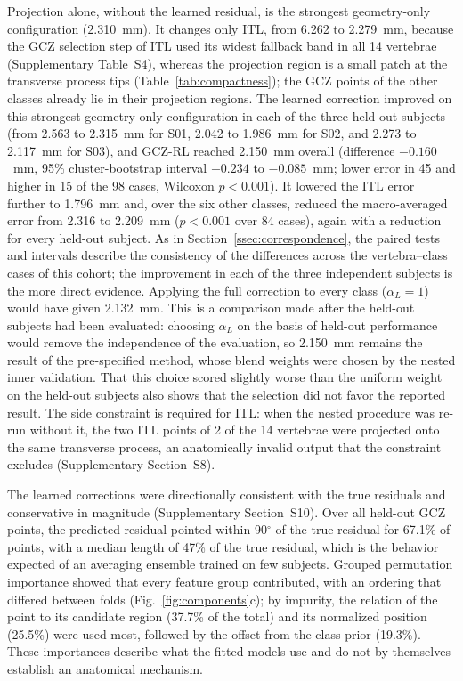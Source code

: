 \documentclass[5p,times,twocolumn,authoryear]{elsarticle}
\newif\ifhighlight
\newcommand{\revend}{\ifhighlight\par\endgroup\fi}
\begin{document}
Projection alone, without the learned residual, is the strongest geometry-only configuration (2.310~mm). It changes only ITL, from 6.262 to 2.279~mm, because the GCZ selection step of ITL used its widest fallback band in all 14 vertebrae (Supplementary Table~S4), whereas the projection region is a small patch at the transverse process tips (Table~\ref{tab:compactness}); the GCZ points of the other classes already lie in their projection regions. The learned correction improved on this strongest geometry-only configuration in each of the three held-out subjects (from 2.563 to 2.315~mm for S01, 2.042 to 1.986~mm for S02, and 2.273 to 2.117~mm for S03), and GCZ-RL reached 2.150~mm overall (difference $-0.160$~mm, 95\% cluster-bootstrap interval $-0.234$ to $-0.085$~mm; lower error in 45 and higher in 15 of the 98 cases, Wilcoxon $p<0.001$). It lowered the ITL error further to 1.796~mm and, over the six other classes, reduced the macro-averaged error from 2.316 to 2.209~mm ($p<0.001$ over 84 cases), again with a reduction for every held-out subject. As in Section~\ref{ssec:correspondence}, the paired tests and intervals describe the consistency of the differences across the vertebra--class cases of this cohort; the improvement in each of the three independent subjects is the more direct evidence. Applying the full correction to every class ($\alpha_L=1$) would have given 2.132~mm. This is a comparison made after the held-out subjects had been evaluated: choosing $\alpha_L$ on the basis of held-out performance would remove the independence of the evaluation, so 2.150~mm remains the result of the pre-specified method, whose blend weights were chosen by the nested inner validation. That this choice scored slightly worse than the uniform weight on the held-out subjects also shows that the selection did not favor the reported result. The side constraint is required for ITL: when the nested procedure was re-run without it, the two ITL points of 2 of the 14 vertebrae were projected onto the same transverse process, an anatomically invalid output that the constraint excludes (Supplementary Section~S8).

The learned corrections were directionally consistent with the true residuals and conservative in magnitude (Supplementary Section~S10). Over all held-out GCZ points, the predicted residual pointed within 90$^\circ$ of the true residual for 67.1\% of points, with a median length of 47\% of the true residual, which is the behavior expected of an averaging ensemble trained on few subjects. Grouped permutation importance showed that every feature group contributed, with an ordering that differed between folds (Fig.~\ref{fig:components}c); by impurity, the relation of the point to its candidate region (37.7\% of the total) and its normalized position (25.5\%) were used most, followed by the offset from the class prior (19.3\%). These importances describe what the fitted models use and do not by themselves establish an anatomical mechanism.
\revend
\end{document}
